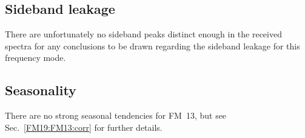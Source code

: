 \subsection{Sideband leakage}
\label{FM13:sbl}
There are unfortunately no sideband peaks distinct enough in the received
spectra for any conclusions to be drawn regarding the sideband leakage for
this frequency mode.

\subsection{Seasonality}
\label{FM13:seasonality}
There are no strong seasonal tendencies for FM~13, but see
Sec.~\ref{FM19:FM13:corr} for further details.
